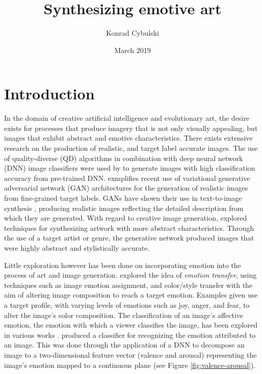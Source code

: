 \documentclass{article}
\title{Synthesizing emotive art}
\author{Konrad Cybulski}
\date{March 2019}
\begin{document}
	
\maketitle


\section{Introduction}

In the domain of creative artificial intelligence and evolutionary art, the desire exists for processes that produce imagery that is not only visually appealing, but images that exhibit abstract and emotive characteristics.
There exists extensive research on the production of realistic, and target label accurate images.
The use of quality-diverse (QD) algorithms in combination with deep neural network (DNN) image classifiers were used by \citet{nguyen2015innovation} to generate images with high classification accuracy from pre-trained DNN.
\citet{bao2017cvae} exmplifies recent use of variational generative adversarial network (GAN) architectures for the generation of realistic images from fine-grained target labels.
GANs have shown their use in text-to-image synthesis \citep{reed2016generative, zhang2017stackgan}, producing realistic images reflecting the detailed description from which they are generated.
With regard to creative image generation, \citet{tan2017artgan} explored techniques for synthesizing artwork with more abstract characteristics.
Through the use of a target artist or genre, the generative network produced images that were highly abstract and stylistically accurate.

Little exploration however has been done on incorporating emotion into the process of art and image generation.
\citet{ali2017emotional} explored the idea of \textit{emotion transfer}, using techniques such as image emotion assignment, and color/style transfer with the aim of altering image composition to reach a target emotion.
Examples given use a target profile, with varying levels of emotions such as joy, anger, and fear, to alter the image's color composition.
The classification of an image's affective emotion, the emotion with which a viewer classifies the image, has been explored in various works \citep{machajdik2010affective, chen2015learning, kim2018building}.
\citet{kim2018building} produced a classifier for recognizing the emotion attributed to an image.
This was done through the application of a DNN to decompose an image to a two-dimensional feature vector (valence and arousal) representing the image's emotion mapped to a continuous plane (see Figure \ref{fig:valence-arousal}).
\end{document}

